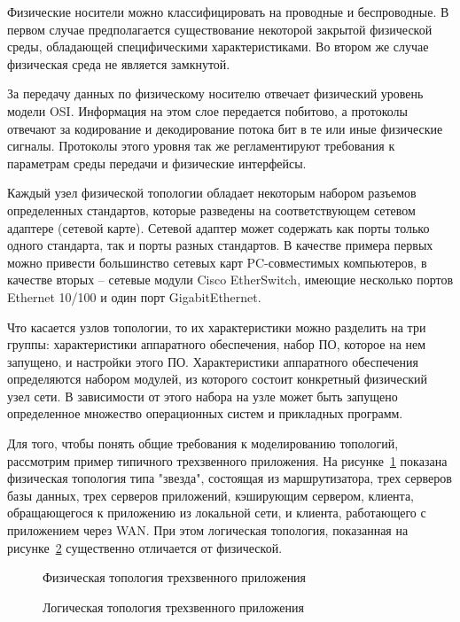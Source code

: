 Физические носители можно классифицировать на проводные и беспроводные. В первом случае
предполагается существование некоторой закрытой физической среды, обладающей
специфическими характеристиками. Во втором же случае физическая среда не является замкнутой.

За передачу данных по физическому носителю отвечает физический уровень модели OSI.
Информация на этом слое передается побитово, а протоколы отвечают за кодирование и
декодирование потока бит в те или иные физические сигналы. Протоколы этого уровня 
так же регламентируют требования к параметрам среды передачи и физические интерфейсы.

Каждый узел физической топологии обладает некоторым набором разъемов определенных
стандартов, которые разведены на соответствующем сетевом адаптере (сетевой карте).
Сетевой адаптер может содержать как порты только одного стандарта, так и
порты разных стандартов. В качестве примера первых можно привести большинство сетевых карт 
PC-совместимых  компьютеров, в качестве вторых -- сетевые модули Cisco EtherSwitch, имеющие 
несколько портов Ethernet 10/100 и один порт GigabitEthernet.\cite{cisco-etherswitch}

Что касается узлов топологии, то их характеристики можно разделить на три группы: 
характеристики аппаратного обеспечения, 
набор ПО, которое на нем запущено, 
и настройки этого ПО.
Характеристики аппаратного обеспечения определяются набором модулей, из которого
состоит конкретный физический узел сети. В зависимости от этого набора на узле
может быть запущено определенное множество операционных систем и прикладных программ.

Для того, чтобы понять общие требования к моделированию топологий, рассмотрим
пример типичного трехзвенного приложения.
На рисунке~\ref{fig:physical-topology-ex} показана физическая топология типа "звезда", состоящая
из маршрутизатора, 
трех серверов базы данных, 
трех серверов приложений, 
кэширующим сервером, 
клиента, обращающегося к приложению из локальной сети, 
и клиента, работающего с  приложением через WAN.
При этом логическая топология, показанная на рисунке~\ref{fig:logical-topology-ex} существенно отличается от физической.

\begin{figure}
  \centering
  {\small}
  \caption{Физическая топология трехзвенного приложения}
  \label{fig:physical-topology-ex}
\end{figure} 

\begin{figure}
  \centering
  {\small}
  \caption{Логическая топология трехзвенного приложения}
  \label{fig:logical-topology-ex}
\end{figure} 

